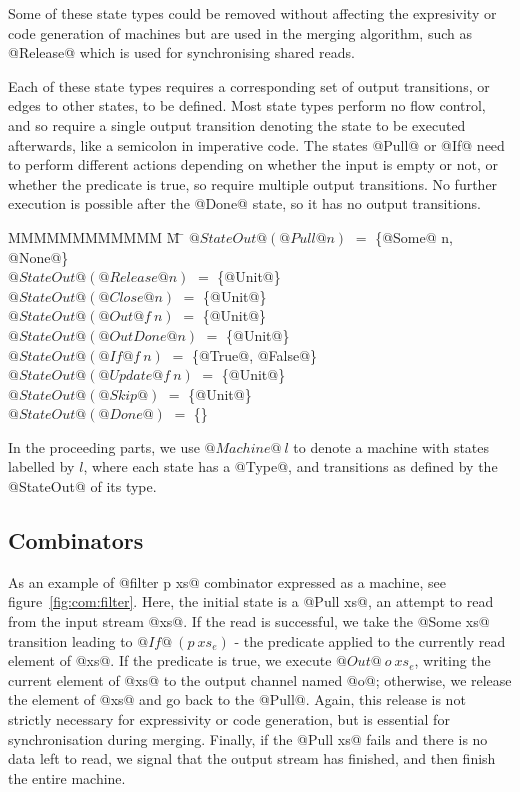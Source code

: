 Some of these state types could be removed without affecting the expresivity or code generation of machines but are used in the merging algorithm, such as @Release@ which is used for synchronising shared reads.

Each of these state types requires a corresponding set of output transitions, or edges to other states, to be defined.
Most state types perform no flow control, and so require a single output transition denoting the state to be executed afterwards, like a semicolon in imperative code.
The states @Pull@ or @If@ need to perform different actions depending on whether the input is empty or not, or whether the predicate is true, so require multiple output transitions.
No further execution is possible after the @Done@ state, so it has no output transitions.
\begin{tabbing}
MMMMMMMMMMMM \= M \= \kill
$@StateOut@(@Pull @n)$
                            \> $=$ \> \{@Some@ n, @None@\} \\
$@StateOut@(@Release @n)$
                            \> $=$ \> \{@Unit@\} \\
$@StateOut@(@Close @n)$
                            \> $=$ \> \{@Unit@\} \\
$@StateOut@(@Out @   f~n)$
                            \> $=$ \> \{@Unit@\} \\
$@StateOut@(@OutDone @ n)$
                            \> $=$ \> \{@Unit@\} \\
$@StateOut@(@If @    f~n)$
                            \> $=$ \> \{@True@, @False@\} \\
$@StateOut@(@Update @f~n)$
                            \> $=$ \> \{@Unit@\} \\
$@StateOut@(@Skip@      )$
                            \> $=$ \> \{@Unit@\} \\
$@StateOut@(@Done@      )$
                            \> $=$ \> \{\} \\
\end{tabbing}

In the proceeding parts, we use $@Machine@~l$ to denote a machine with states labelled by $l$, where each state has a @Type@, and transitions as defined by the @StateOut@ of its type.

\subsection{Combinators}
\label{s:Machines:Combinators}
As an example of @filter p xs@ combinator expressed as a machine, see figure~\ref{fig:com:filter}.
Here, the initial state is a @Pull xs@, an attempt to read from the input stream @xs@.
If the read is successful, we take the @Some xs@ transition leading to $@If@~(p~xs_e)$ - the predicate applied to the currently read element of @xs@.
If the predicate is true, we execute $@Out@~o~xs_e$, writing the current element of @xs@ to the output channel named @o@; otherwise, we release the element of @xs@ and go back to the @Pull@.
Again, this release is not strictly necessary for expressivity or code generation, but is essential for synchronisation during merging.
Finally, if the @Pull xs@ fails and there is no data left to read, we signal that the output stream has finished, and then finish the entire machine.

